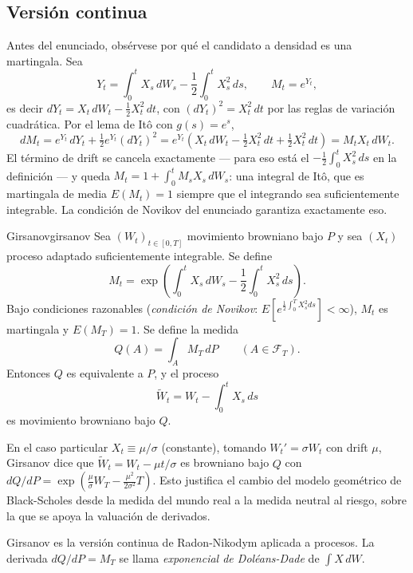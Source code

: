 \documentclass[11pt, a4paper]{article}
\begin{document}
\subsection{Versión continua}

Antes del enunciado, obsérvese por qué el candidato a densidad es una martingala. Sea
$$ Y_t = \int_0^t X_s \, dW_s - \frac{1}{2} \int_0^t X_s^2 \, ds, \qquad M_t = e^{Y_t}, $$
es decir $dY_t = X_t \, dW_t - \tfrac{1}{2} X_t^2 \, dt$, con $(dY_t)^2 = X_t^2 \, dt$ por las
reglas de variación cuadrática. Por el lema de Itô con $g(s) = e^s$,
$$ dM_t = e^{Y_t} \, dY_t + \tfrac{1}{2} e^{Y_t} (dY_t)^2 = e^{Y_t} \left( X_t \, dW_t -
\tfrac{1}{2} X_t^2 \, dt + \tfrac{1}{2} X_t^2 \, dt \right) = M_t X_t \, dW_t. $$
El término de drift se cancela exactamente — para eso está el $-\tfrac{1}{2} \int_0^t X_s^2
\, ds$ en la definición — y queda $M_t = 1 + \int_0^t M_s X_s \, dW_s$: una integral de Itô,
que es martingala de media $E(M_t) = 1$ siempre que el integrando sea suficientemente
integrable. La condición de Novikov del enunciado garantiza exactamente eso.

\begin{teorema}{Girsanov}{girsanov}
Sea $(W_t)_{t \in [0, T]}$ movimiento browniano bajo $P$ y sea $(X_t)$ proceso adaptado
suficientemente integrable. Se define
$$ M_t = \exp\!\left( \int_0^t X_s \, dW_s - \frac{1}{2} \int_0^t X_s^2 \, ds \right). $$
Bajo condiciones razonables (\emph{condición de Novikov}: $E[e^{\tfrac{1}{2} \int_0^T X_s^2 ds}]
< \infty$), $M_t$ es martingala y $E(M_T) = 1$. Se define la medida
$$ Q(A) = \int_A M_T \, dP \qquad (A \in \mathcal{F}_T). $$
Entonces $Q$ es equivalente a $P$, y el proceso
$$ \widetilde{W}_t = W_t - \int_0^t X_s \, ds $$
es movimiento browniano bajo $Q$.
\end{teorema}

\obs En el caso particular $X_t \equiv \mu/\sigma$ (constante), tomando $W_t' = \sigma W_t$ con
drift $\mu$, Girsanov dice que $\widetilde{W}_t = W_t - \mu t/\sigma$ es browniano bajo
$Q$ con $dQ/dP = \exp(\tfrac{\mu}{\sigma} W_T - \tfrac{\mu^2}{2\sigma^2} T)$. Esto justifica el
cambio del modelo geométrico de Black-Scholes desde la medida del mundo real a la medida
neutral al riesgo, sobre la que se apoya la valuación de derivados.

\obs Girsanov es la versión continua de Radon-Nikodym aplicada a procesos. La derivada
$dQ/dP = M_T$ se llama \emph{exponencial de Doléans-Dade} de $\int X \, dW$.

\newpage
\end{document}
